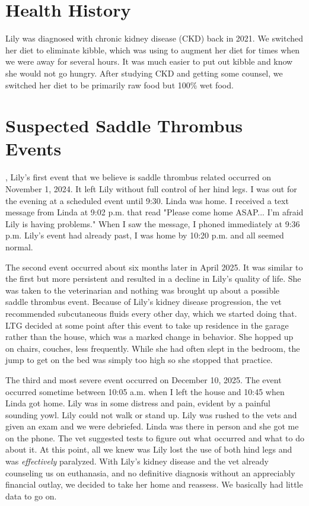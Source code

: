 \documentclass[twocolumn]{NobArticle}
\begin{document}
	\section{Health History}
	Lily was diagnosed with chronic kidney disease (CKD) back in 2021. We switched her diet to eliminate kibble, which was using to augment her diet for times when we were away for several hours. It was much easier to put out kibble and know she would not go hungry. After studying CKD and getting some counsel, we switched her diet to be primarily raw food but 100\% wet food.
	
	\section{Suspected Saddle Thrombus Events},
	Lily's first event that we believe is saddle thrombus related occurred on November 1, 2024. It left Lily without full control of her hind legs. I was out for the evening at a scheduled event until 9:30. Linda was home. I received a text message from Linda at 9:02 p.m. that read "Please come home ASAP... I'm afraid Lily is having problems." When I saw the message, I phoned immediately at 9:36 p.m. Lily's event had already past, I was home by 10:20 p.m. and all seemed normal.
	
	The second event occurred about six months later in April 2025. It was similar to the first but more persistent and resulted in a decline in Lily's quality of life. She was taken to the veterinarian and nothing was brought up about a possible saddle thrombus event. Because of Lily's kidney disease progression, the vet recommended subcutaneous fluids every other day, which we started doing that. LTG decided at some point after this event to take up residence in the garage rather than the house, which was a marked change in behavior. She hopped up on chairs, couches, less frequently. While she had often slept in the bedroom, the jump to get on the bed was simply too high so she stopped that practice.
	
	The third and most severe event occurred on December 10, 2025. The event occurred sometime between 10:05 a.m. when I left the house and 10:45 when Linda got home. Lily was in some distress and pain, evident by a painful sounding yowl. Lily could not walk or stand up. Lily was rushed to the vets and given an exam and we were debriefed. Linda was there in person and she got me on the phone. The vet suggested tests to figure out what occurred and what to do about it. At this point, all we knew was Lily lost the use of both hind legs and was \textit{effectively} paralyzed. With Lily's kidney disease and the vet already counseling us on euthanasia, and no definitive diagnosis without an appreciably financial outlay, we decided to take her home and reassess. We basically had little data to go on. 
	
\end{document}
